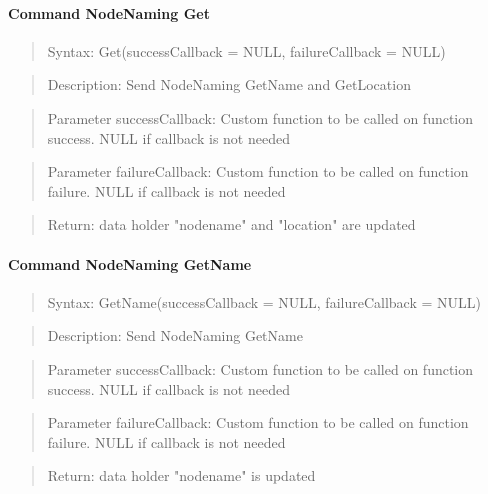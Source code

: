 \paragraph {Command NodeNaming Get}
\begin{quote} Syntax: Get(successCallback = NULL, failureCallback = NULL)\end{quote}
\begin{quote}Description: Send NodeNaming GetName and GetLocation\end{quote}
\begin{quote} Parameter successCallback: Custom function to be called on function success. NULL if callback is not needed\end{quote}
\begin{quote} Parameter failureCallback: Custom function to be called on function failure. NULL if callback is not needed\end{quote}
\begin{quote} Return: data holder "nodename" and "location" are updated\end{quote}

\paragraph {Command NodeNaming GetName}
\begin{quote} Syntax: GetName(successCallback = NULL, failureCallback = NULL)\end{quote}
\begin{quote} Description: Send NodeNaming GetName\end{quote}
\begin{quote} Parameter successCallback: Custom function to be called on function success. NULL if callback is not needed\end{quote}
\begin{quote} Parameter failureCallback: Custom function to be called on function failure. NULL if callback is not needed\end{quote}
\begin{quote} Return: data holder "nodename"  is updated\end{quote}

